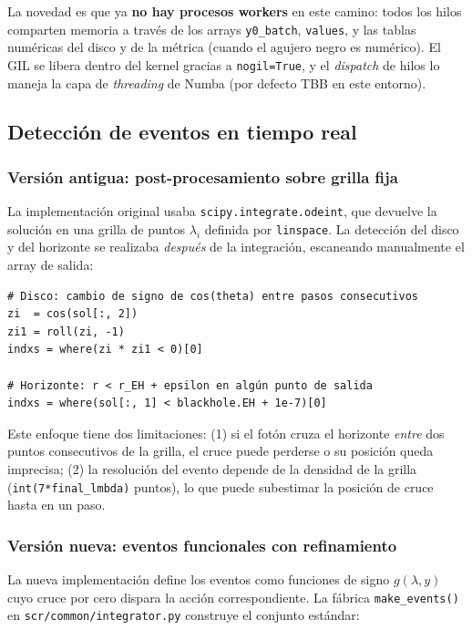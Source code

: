 \documentclass[11pt,a4paper]{article}
\begin{document}
La novedad es que ya \textbf{no hay procesos workers} en este camino:
todos los hilos comparten memoria a través de los arrays \texttt{y0\_batch},
\texttt{values}, y las tablas numéricas del disco y de la métrica (cuando
el agujero negro es numérico). El GIL se libera dentro del kernel gracias
a \verb|nogil=True|, y el \emph{dispatch} de hilos lo maneja la capa de
\emph{threading} de Numba (por defecto TBB en este entorno).

\subsection{Detección de eventos en tiempo real}

\subsubsection{Versión antigua: post-procesamiento sobre grilla fija}

La implementación original usaba \texttt{scipy.integrate.odeint}, que
devuelve la solución en una grilla de puntos $\lambda_i$ definida por
\texttt{linspace}. La detección del disco y del horizonte se realizaba
\emph{después} de la integración, escaneando manualmente el array de
salida:

\begin{lstlisting}[style=py, caption={Detección de eventos en la versión vieja.}]
# Disco: cambio de signo de cos(theta) entre pasos consecutivos
zi  = cos(sol[:, 2])
zi1 = roll(zi, -1)
indxs = where(zi * zi1 < 0)[0]

# Horizonte: r < r_EH + epsilon en algún punto de salida
indxs = where(sol[:, 1] < blackhole.EH + 1e-7)[0]
\end{lstlisting}

Este enfoque tiene dos limitaciones: (1) si el fotón cruza el horizonte
\emph{entre} dos puntos consecutivos de la grilla, el cruce puede
perderse o su posición queda imprecisa; (2) la resolución del evento
depende de la densidad de la grilla (\texttt{int(7*final\_lmbda)}
puntos), lo que puede subestimar la posición de cruce hasta en un paso.

\subsubsection{Versión nueva: eventos funcionales con refinamiento}

La nueva implementación define los eventos como funciones de signo
$g(\lambda, y)$ cuyo cruce por cero dispara la acción correspondiente.
La fábrica \texttt{make\_events()} en
\texttt{scr/common/integrator.py} construye el conjunto estándar:
\end{document}
